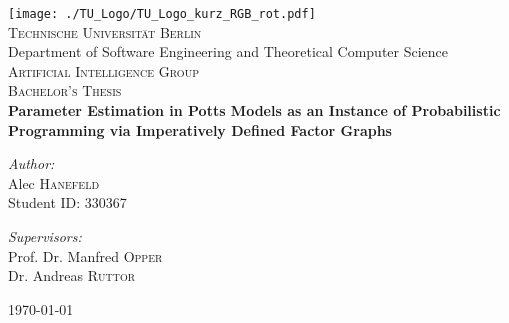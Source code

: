 \begin{titlepage}
\begin{center}

\texttt{[image: ./TU\_Logo/TU\_Logo\_kurz\_RGB\_rot.pdf]}~\\[1cm]

\textsc{\LARGE Technische Universität Berlin}\\[0.3cm]
\large{Department of Software Engineering and Theoretical Computer Science}\\[0.3cm]
\textsc{\large Artificial Intelligence Group}\\[2cm]

\textsc{\Large Bachelor's Thesis}\\[0.5cm]

{ \Large \bfseries Parameter Estimation in Potts Models as an Instance of Probabilistic Programming via Imperatively Defined Factor Graphs \\[1.5cm] }


\begin{minipage}{0.4\textwidth}
\begin{flushleft} \large
\emph{Author:}\\
Alec \textsc{Hanefeld}\\
Student ID: 330367
\end{flushleft}
\end{minipage}
\begin{minipage}{0.4\textwidth}
\begin{flushright} \large
\emph{Supervisors:}\\
Prof. Dr. Manfred \textsc{Opper}\\
Dr. Andreas \textsc{Ruttor}
\end{flushright}
\end{minipage}

\vfill

{\large \today}

\end{center}
\end{titlepage}